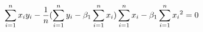 \documentclass[preview]{standalone}
\begin{document}
\begin{align*}
{{\special{dvisvgm:raw <g id='unique000'>}\sum_{i=1}^n{x_i y_i}-\frac{1}{n}(\sum_{i=1}^n{y_i}-\beta_1\sum_{i=1}^n{x_i})\sum_{i=1}^n{x_i}}}-\beta_1\sum_{i=1}^n{{x_i}^2}=0\special{dvisvgm:raw </g>}
\end{align*}
\end{document}
